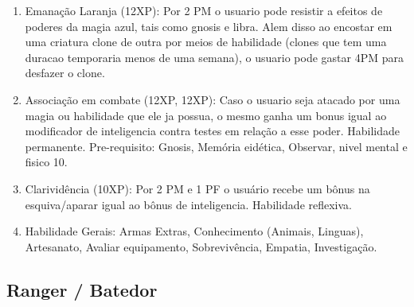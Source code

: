 \begin{enumerate}
	
	\item Emanação Laranja (12XP): Por 2 PM o usuario pode resistir a efeitos de poderes da magia azul, tais como gnosis e libra. Alem disso ao encostar em uma criatura clone de outra por meios de habilidade (clones que tem uma duracao temporaria menos de uma semana), o usuario pode gastar 4PM para desfazer o clone.

    \item Associação em combate (12XP, 12XP): Caso o usuario seja atacado por uma magia ou habilidade que ele ja possua, o mesmo ganha um bonus igual ao modificador de inteligencia contra testes em relação a esse poder. Habilidade permanente. Pre-requisito: Gnosis, Memória eidética, Observar, nivel mental e fisico 10.


	\item Clarividência (10XP): Por 2 PM e 1 PF o usuário recebe um bônus na esquiva/aparar igual ao bônus de inteligencia. Habilidade reflexiva.

	\item Habilidade Gerais: Armas Extras, Conhecimento (Animais, Linguas), Artesanato, Avaliar equipamento, Sobrevivência, Empatia, Investigação. 
	
\end{enumerate}


\subsection{Ranger / Batedor} 

